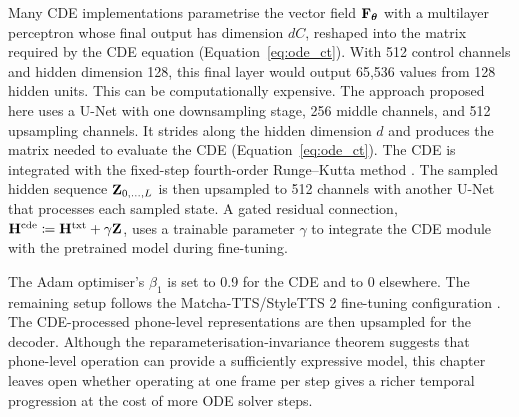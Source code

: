 Many \ac{CDE} implementations \citep{kidger2020neuralcde} parametrise the vector field ${\mathbf{F}}_{\bm{\theta}}$ with a multilayer perceptron whose final output has dimension $dC$, reshaped into the matrix required by the \ac{CDE} equation (Equation~\ref{eq:ode_ct}). With 512 control channels and hidden dimension 128, this final layer would output 65,536 values from 128 hidden units. This can be computationally expensive. The approach proposed here uses a U-Net \citep{ronneberger2015unet} with one downsampling stage, 256 middle channels, and 512 upsampling channels. It strides along the hidden dimension $d$ and produces the matrix needed to evaluate the \ac{CDE} (Equation~\ref{eq:ode_ct}). The \ac{CDE} is integrated with the fixed-step fourth-order Runge--Kutta method \citep{Runge1895UeberDN,kutta1901beitrag}. The sampled hidden sequence ${\mathbf{Z}}_{0,\dots,L}$ is then upsampled to 512 channels with another U-Net that processes each sampled state. A gated residual connection, ${\mathbf{H}}^\textnormal{cde}\coloneqq {\mathbf{H}}^\textnormal{txt}+\gamma{\mathbf{Z}}$, uses a trainable parameter $\gamma$ to integrate the \ac{CDE} module with the pretrained model during fine-tuning. 

The Adam optimiser's $\beta_1$ is set to 0.9 for the \ac{CDE} and to 0 elsewhere. The remaining setup follows the Matcha-TTS/StyleTTS 2 fine-tuning configuration \citep{mehta2024matcha,li2023styletts2}. The CDE-processed phone-level representations are then upsampled for the decoder. Although the reparameterisation-invariance theorem \citep{kidger2021thesis} suggests that phone-level operation can provide a sufficiently expressive model, this chapter leaves open whether operating at one frame per step gives a richer temporal progression at the cost of more \ac{ODE} solver steps.


